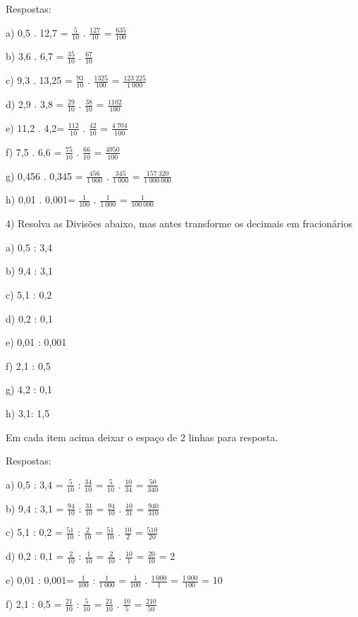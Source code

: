 {Respostas:

a) 0,5 . 12,7 = \(\frac{5}{10}\) . \(\frac{127}{10}\) =
\(\frac{635}{100}\)

b) 3,6 . 6,7 = \(\frac{35}{10}\) . \(\frac{67}{10}\)

c) 9,3 . 13,25 = \(\frac{93}{10}\) . \(\frac{1325}{100}\) =
\(\frac{123\ 225}{1\ 000}\)

d) 2,9 . 3,8 = \(\frac{29}{10}\) . \(\frac{38}{10}\) =
\(\frac{1102}{100}\)

e) 11,2 . 4,2= \(\frac{112}{10}\) . \(\frac{42}{10}\) =
\(\frac{4\ 704}{100}\)

f) 7,5 . 6,6 = \(\frac{75}{10}\) . \(\frac{66}{10}\) =
\(\frac{4950}{100}\)

g) 0,456 . 0,345 = \(\frac{456}{1\ 000}\) . \(\frac{345}{1\ 000}\) =
\(\frac{157\ 320}{1\ 000\ 000}\)

h) 0,01 . 0,001= \(\frac{1}{100}\) . \(\frac{1}{1\ 000}\) =
\(\frac{1}{100\ 000}\)

4) Resolva as Divisões abaixo, mas antes transforme os decimais em
fracionários

a) 0,5 : 3,4

b) 9,4 : 3,1

c) 5,1 : 0,2

d) 0,2 : 0,1

e) 0,01 : 0,001

f) 2,1 : 0,5

g) 4,2 : 0,1

h) 3,1: 1,5

Em cada item acima deixar o espaço de 2 linhas para resposta.

Respostas:

a) 0,5 : 3,4 = \(\frac{5}{10}\) : \(\frac{34}{10}\) = \(\frac{5}{10}\) .
\(\frac{10}{34}\) = \(\frac{50}{340}\)

b) 9,4 : 3,1 = \(\frac{94}{10}\) : \(\frac{31}{10}\) = \(\frac{94}{10}\)
. \(\frac{10}{31}\) = \(\frac{940}{310}\)

c) 5,1 : 0,2 = \(\frac{51}{10}\) : \(\frac{2}{10}\) = \(\frac{51}{10}\)
. \(\frac{10}{2}\) = \(\frac{510}{20}\)

d) 0,2 : 0,1 = \(\frac{2}{10}\) : \(\frac{1}{10}\) = \(\frac{2}{10}\) .
\(\frac{10}{1}\) = \(\frac{20}{10}\) = 2

e) 0,01 : 0,001= \(\frac{1}{100}\) : \(\frac{1}{1\ 000}\) =
\(\frac{1}{100}\) . \(\frac{1\ 000}{1}\) = \(\frac{1\ 000}{100}\) = 10

f) 2,1 : 0,5 = \(\frac{21}{10}\) : \(\frac{5}{10}\) = \(\frac{21}{10}\)
. \(\frac{10}{5}\) = \(\frac{210}{50}\)

}

